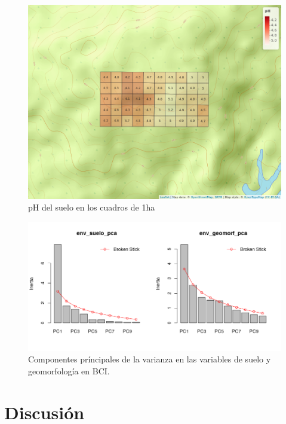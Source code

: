 \documentclass[11pt,]{article}
\begin{document}
\begin{figure}
\centering
\includegraphics{mapa_cuadros_ph.png}
\caption{pH del suelo en los cuadros de 1ha \label{fig:mapa_cuadros_ph}}
\end{figure}

\begin{figure}
\centering
\includegraphics{env_suelo_geomorf_pca_br_stick.png}
\caption{Componentes príncipales de la varianza en las variables de
suelo y geomorfología en BCI. \label{fig:pca_suelo_geomorf_br_stick}}
\end{figure}

\section{Discusión}\label{discusiuxf3n}
\end{document}
